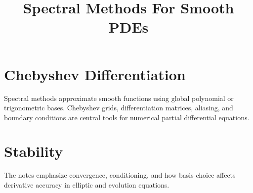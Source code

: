 \title{Spectral Methods For Smooth PDEs}
\section{Chebyshev Differentiation}
Spectral methods approximate smooth functions using global polynomial or
trigonometric bases. Chebyshev grids, differentiation matrices, aliasing, and
boundary conditions are central tools for numerical partial differential
equations.

\section{Stability}
The notes emphasize convergence, conditioning, and how basis choice affects
derivative accuracy in elliptic and evolution equations.
